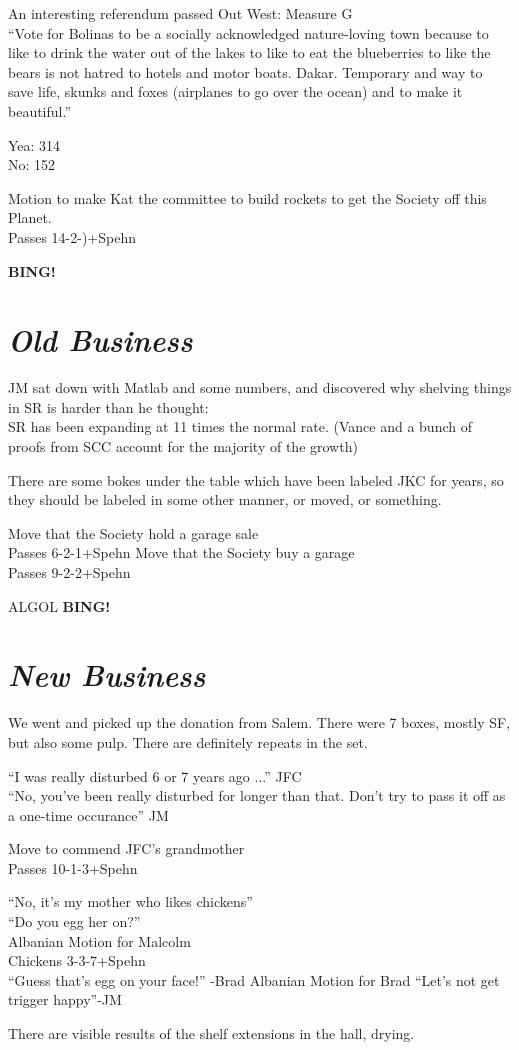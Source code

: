 \documentclass[10pt]{article}
\newcommand{\bing}{{\bf BING!} }
\newcommand{\goto}[1]{\bing \vskip 12pt \section*{{\em{#1}}}}
\begin{document}
An interesting referendum passed Out West: 
Measure G\\
``Vote for Bolinas to be a socially acknowledged nature-loving town
because to like to drink the water out of the lakes to like to eat the
blueberries to like the bears is not hatred to hotels and motor
boats. Dakar. Temporary and way to save life, skunks and foxes
(airplanes to go over the ocean) and to make it beautiful.''

Yea: 314\\
No: 152

Motion to make Kat the committee to build rockets to get the Society
off this Planet.\\
Passes 14-2-)+Spehn

\goto{Old Business}
JM sat down with Matlab and some numbers, and discovered why shelving
things in SR is harder than he thought: \\
SR has been expanding at 11 times the normal rate. 
(Vance and a bunch of proofs from SCC account for the majority of the growth)

There are some bokes under the table which have been labeled JKC for
years, so they should be labeled in some other manner, or moved, or
something.

Move that the Society hold a garage sale\\
Passes 6-2-1+Spehn
Move that the Society buy a garage\\
Passes 9-2-2+Spehn

ALGOL
\goto{New Business}
We went and picked up the donation from Salem.  There were 7 boxes,
mostly SF, but also some pulp. There are definitely repeats in the
set.

``I was really disturbed 6 or 7 years ago ...'' JFC\\
``No, you've been really disturbed for longer than that. Don't try to
pass it off as a one-time occurance'' JM

Move to commend JFC's grandmother\\
Passes 10-1-3+Spehn

``No, it's my mother who likes chickens''\\
``Do you egg her on?''\\
Albanian Motion for Malcolm\\
Chickens 3-3-7+Spehn\\
``Guess that's egg on your face!'' -Brad
Albanian Motion for Brad
``Let's not get trigger happy''-JM


There are visible results of the shelf extensions in the hall, drying.
\end{document}
